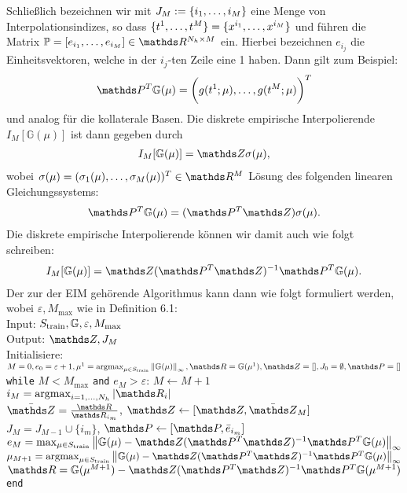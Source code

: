 Schließlich bezeichnen wir mit $J_M:=\{i_1, \dots ,i_M\}$ eine Menge von Interpolationsindizes, so dass $\{t^1, \dots ,t^M\} = \{x^{i_1}, \dots ,x^{i_M}\}$ und führen die Matrix $\mathbb{P} = [e_{i_1}\dt{,}e_{i_M}]\in \R^{N_h\times M}$ ein.
Hierbei bezeichnen $e_{i_j}$ die Einheitsvektoren, welche in der $i_j$-ten Zeile eine 1 haben.
Dann gilt zum Beispiel:
\[
\Pw^T \mathbb{G}(\mu) = \bigg( g(t^1;\mu)\dt{,} g(t^M;\mu) \bigg)^T
\]
und analog für die kollaterale Basen.
Die diskrete empirische Interpolierende $I_M[\mathbb{G}(\mu)]$ ist dann gegeben durch
\begin{align}
I_M[\mathbb{G}(\mu)] = \Z \sigma(\mu),
\end{align}
wobei $\sigma(\mu) = (\sigma_1(\mu)\dt{,}\sigma_M(\mu))^T \in \R^M$ Lösung des folgenden linearen Gleichungssystems:
\begin{align}
\Pw^T \mathbb{G}(\mu) = (\Pw^T\Z)\sigma(\mu).
\end{align}
Die diskrete empirische Interpolierende können wir damit auch wie folgt schreiben:
\begin{align}
I_M[\mathbb{G}(\mu)] = \Z (\Pw^T\Z)^{-1} \Pw^T \mathbb{G}(\mu).
\end{align}
Der zur  der EIM gehörende Algorithmus kann dann wie folgt formuliert werden, wobei $\varepsilon,M_{\max}$ wie in Definition 6.1:\\
Input: $S_{\operatorname{train}}, \mathbb{G}, \varepsilon, M_{\max}$\\
Output: $\Z, J_M$\\
Initialisiere: $M=0, e_0= \varepsilon+1, \mu^1=\argmax_{\mu\in S_{\train}} \norm{\mathbb{G}(\mu)}_{\infty}, \R=\mathbb{G}(\mu^1), \Z=[], J_0=\emptyset, \Pw=[]$\\
\texttt{while} $M<M_{\max}$ \texttt{and} $e_M>\varepsilon$:
\qquad $M \leftarrow M+1$\\
\qquad $i_M = \argmax_{i=1\dt{,}N_h}\abs{\R_i}$\\
\qquad $\bar{\Z} = \frac{\R}{\R_{i_m}}$, $\Z \leftarrow [\Z,\bar{\Z}_M]$\\
\qquad $J_M = J_{M-1} \cup \{i_m\}$, $\Pw \leftarrow [\Pw, \bar{e}_{i_m}]$\\
\qquad $e_M = \max_{\mu\in S_{\train}} \norm{\mathbb{G}(\mu) - \Z(\Pw^T\Z)^{-1}\Pw^T\mathbb{G}(\mu)}_{\infty}$\\
\qquad $\mu_{M+1} = \argmax_{\mu\in S_{\train}} \norm{\mathbb{G}(\mu) - \Z(\Pw^T\Z)^{-1}\Pw^T\mathbb{G}(\mu)}_{\infty}$\\
\qquad $\R = \mathbb{G}(\mu^{M+1}) -\Z(\Pw^T\Z)^{-1}\Pw^T\mathbb{G}(\mu^{M+1})$\\
\texttt{end}

